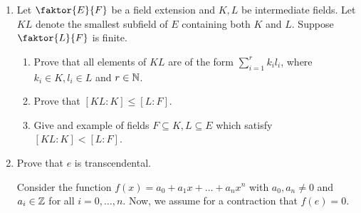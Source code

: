 \documentclass[answers]{exam}
\newcommand{\quotient}[2]{\faktor{#1}{#2}}
\begin{document}
\begin{enumerate}
\begin{enumerate}
\begin{solution}
\end{solution}
\end{enumerate}

\item Let $\quotient{E}{F}$ be a field extension and $K,L$ be intermediate
fields. Let $KL$ denote the smallest subfield of $E$ containing both $K$ and
$L$. Suppose $\quotient{L}{F}$ is finite.
\begin{enumerate}
\item  Prove that all elements of $KL$ are of the form
$\displaystyle\sum\limits^r_{i=1} k_il_i$, where $k_i \in K, l_i \in L$ and $r
\in \mathbb{N}$.
\begin{solution}

\end{solution}

\item Prove that $[KL:K] \leq [L:F]$.
\begin{solution}

\end{solution}

\item Give and example of fields $F \subseteq K, L \subseteq E$ which satisfy
$[KL:K] < [L:F]$.
\begin{solution}

\end{solution}
\end{enumerate}

\item Prove that $e$ is transcendental.
\begin{solution}
Consider the function $f(x) = a_0 + a_1x + \dots + a_nx^n$ with $a_0, a_n \neq
0$ and $a_i \in \mathbb{Z}$ for all $i = 0,\dots,n$. Now, we assume for a contraction
that $f(e) = 0$. 
\end{solution}
\end{enumerate}
\end{document}
